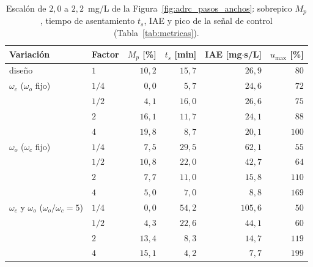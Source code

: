 \begin{table}[H]
\centering
\caption[Desempeño del escalón al variar los anchos de banda]{Escalón de
  $2{,}0$ a $2{,}2$~mg/L de la Figura~\ref{fig:adrc_pasos_anchos}: sobrepico $M_p$, tiempo de
  asentamiento $t_s$, IAE y pico de la señal de control (Tabla~\ref{tab:metricas}).}
\label{tab:adrc_iae_anchos}
\small
\begin{tabular}{llrrrr}
\toprule
\textbf{Variación} & \textbf{Factor} & $M_p$ [\%] & $t_s$ [min] & IAE [mg$\cdot$s/L] & $u_{\max}$ [\%] \\
\midrule
diseño & $1$ & $10{,}2$ & $15{,}7$ & $26{,}9$ & $80$ \\
\midrule
$\omega_c$ ($\omega_o$ fijo) & $1/4$ & $0{,}0$ & $5{,}7$ & $24{,}6$ & $72$ \\
 & $1/2$ & $4{,}1$ & $16{,}0$ & $26{,}6$ & $75$ \\
 & $2$ & $16{,}1$ & $11{,}7$ & $24{,}1$ & $88$ \\
 & $4$ & $19{,}8$ & $8{,}7$ & $20{,}1$ & $100$ \\
\midrule
$\omega_o$ ($\omega_c$ fijo) & $1/4$ & $7{,}5$ & $29{,}5$ & $62{,}1$ & $55$ \\
 & $1/2$ & $10{,}8$ & $22{,}0$ & $42{,}7$ & $64$ \\
 & $2$ & $7{,}7$ & $11{,}0$ & $15{,}8$ & $110$ \\
 & $4$ & $5{,}0$ & $7{,}0$ & $8{,}8$ & $169$ \\
\midrule
$\omega_c$ y $\omega_o$ ($\omega_o/\omega_c = 5$) & $1/4$ & $0{,}0$ & $54{,}2$ & $105{,}6$ & $50$ \\
 & $1/2$ & $4{,}3$ & $22{,}6$ & $44{,}1$ & $60$ \\
 & $2$ & $13{,}4$ & $8{,}3$ & $14{,}7$ & $119$ \\
 & $4$ & $15{,}1$ & $4{,}2$ & $7{,}7$ & $199$ \\
\bottomrule
\end{tabular}
\end{table}

